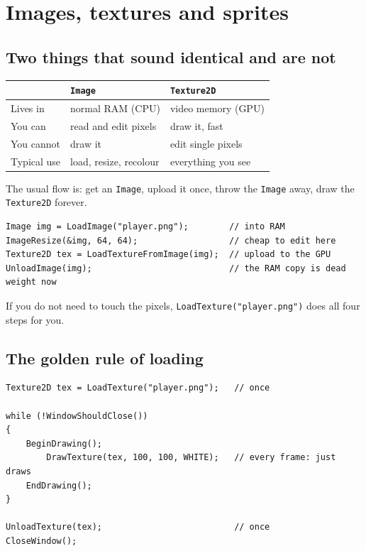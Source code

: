 \chapter{Images, textures and sprites}

\section{Two things that sound identical and are not}

\begin{center}
\begin{tabular}{@{}lll@{}}
\toprule
 & \textbf{\lstinline|Image|} & \textbf{\lstinline|Texture2D|} \\
\midrule
Lives in & normal RAM (CPU) & video memory (GPU) \\
You can  & read and edit pixels & draw it, fast \\
You cannot & draw it & edit single pixels \\
Typical use & load, resize, recolour & everything you see \\
\bottomrule
\end{tabular}
\end{center}

The usual flow is: get an \lstinline|Image|, upload it once, throw the
\lstinline|Image| away, draw the \lstinline|Texture2D| forever.

\begin{lstlisting}
Image img = LoadImage("player.png");        // into RAM
ImageResize(&img, 64, 64);                  // cheap to edit here
Texture2D tex = LoadTextureFromImage(img);  // upload to the GPU
UnloadImage(img);                           // the RAM copy is dead weight now
\end{lstlisting}

If you do not need to touch the pixels, \lstinline|LoadTexture("player.png")|
does all four steps for you.

\section{The golden rule of loading}


\begin{lstlisting}
Texture2D tex = LoadTexture("player.png");   // once

while (!WindowShouldClose())
{
    BeginDrawing();
        DrawTexture(tex, 100, 100, WHITE);   // every frame: just draws
    EndDrawing();
}

UnloadTexture(tex);                          // once
CloseWindow();
\end{lstlisting}

